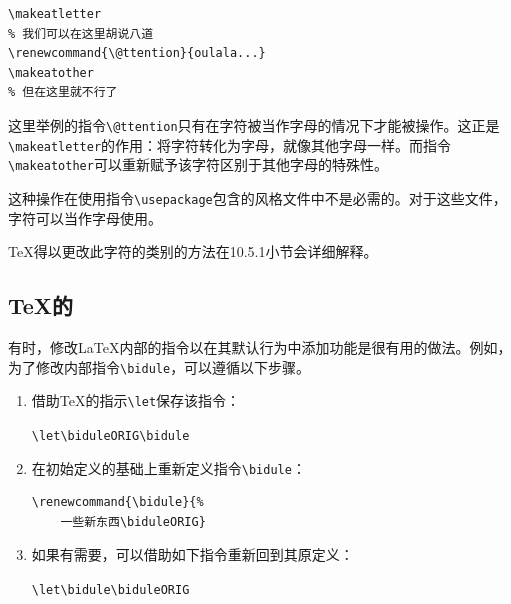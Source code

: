 \begin{dmd}
\begin{verbatim}
\makeatletter
% 我们可以在这里胡说八道
\renewcommand{\@ttention}{oulala...}
\makeatother
% 但在这里就不行了
\end{verbatim}
\end{dmd}

这里举例的指令\verb+\@ttention+只有在字符被当作字母的情况下才能被操作。这正是\verb+\makeatletter+的作用：将字符转化为字母，就像其他字母一样。而指令\verb+\makeatother+可以重新赋予该字符区别于其他字母的特殊性。

\begin{exclamation}
这种操作在使用指令\verb+\usepackage+包含的风格文件中不是必需的。对于这些文件，字符可以当作字母使用。
\end{exclamation}

\TeX 得以更改此字符的类别的方法在10.5.1小节会详细解释。

\subsection{\TeX 的}

有时，修改\LaTeX 内部的指令以在其默认行为中添加功能是很有用的做法。例如，为了修改内部指令\verb+\bidule+，可以遵循以下步骤。

\begin{enumerate}
    \item 借助\TeX 的指示\verb+\let+保存该指令：
    
    \begin{dmd}
    \verb|\let\biduleORIG\bidule|
    \end{dmd}

    \item 在初始定义的基础上重新定义指令\verb+\bidule+：
    
    \begin{dmd}
    \begin{verbatim}
\renewcommand{\bidule}{%
    一些新东西\biduleORIG}
    \end{verbatim}
    \end{dmd}

    \item 如果有需要，可以借助如下指令重新回到其原定义：
    
    \begin{dmd}
    \verb+\let\bidule\biduleORIG+
    \end{dmd}
\end{enumerate}

